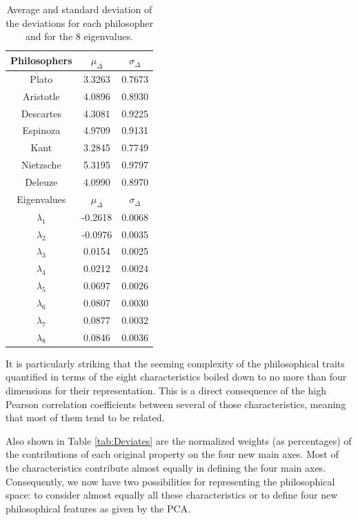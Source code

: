 \documentclass[%
 aip,
 jmp,%
 amsmath,amssymb,
 reprint,%
]{revtex4-1}
\begin{document}
\begin{table}%
\caption{\label{tab:tableD}Average and standard deviation of the 
deviations for each philosopher and for the 8 eigenvalues.  }

\begin{tabular}{|c||c|c|}
\hline

Philosophers & $\mu_{\Delta}$ & $\sigma_{\Delta}$ \\
\hline
Plato          & 3.3263 & 0.7673 \\
Aristotle      & 4.0896 & 0.8930 \\
Descartes      & 4.3081 & 0.9225 \\
Espinoza       & 4.9709 & 0.9131 \\
Kant           & 3.2845 & 0.7749 \\
Nietzsche      & 5.3195 & 0.9797 \\
Deleuze        & 4.0990 & 0.8970 \\
\hline \hline
Eigenvalues & $\mu_{\Delta}$ & $\sigma_{\Delta}$ \\
\hline
$\lambda_1$ & -0.2618 & 0.0068 \\
$\lambda_2$ & -0.0976 & 0.0035 \\
$\lambda_3$ &  0.0154 & 0.0025 \\
$\lambda_4$ &  0.0212 & 0.0024 \\
$\lambda_5$ &  0.0697 & 0.0026 \\
$\lambda_6$ &  0.0807 & 0.0030 \\
$\lambda_7$ &  0.0877 & 0.0032 \\
$\lambda_8$ &  0.0846 & 0.0036 \\
\hline

\end{tabular}
\end{table}

It is particularly striking that the seeming complexity of the
philosophical traits quantified in terms of the eight characteristics
boiled down to no more than four dimensions for their representation.
This is a direct consequence of the high Pearson correlation
coefficients between several of those characteristics, meaning that
most of them tend to be related.

Also shown in Table \ref{tab:Deviates} are the normalized weights (as
percentages) of the contributions of each original property on the four
new main axes.  Most of the characteristics contribute almost equally
in defining the four main axes.  Consequently, we now have two
possibilities for representing the philosophical space: to consider
almost equally all these characteristics or to define four new
philosophical features as given by the PCA.
\end{document}
